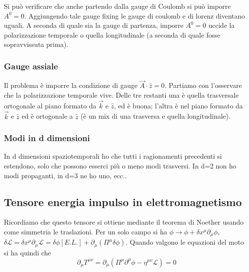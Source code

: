 \documentclass[12pt,oneside,notitlepage,abstracton,a4paper]{scrartcl}
\renewcommand{\L}{\mathcal{L}}
\begin{document}
Si può verificare che anche partendo dalla gauge di Coulomb si può imporre $A^0=0$. Aggiungendo tale gauge fixing le gauge di coulomb e di lorenz diventano uguali. A seconda di quale sia la gauge di partenza, imporre $A^0=0$ uccide la polarizzazione temporale o quella longitudinale (a seconda di quale fosse sopravvissuta prima).

\subsubsection{Gauge assiale}
Il problema è imporre la condizione di gauge $\vec{A} \cdot \hat{z} = 0$. Partiamo con l'osservare che la polarizzazione temporale vive. Delle tre restanti una è quella trasversale ortogonale al piano formato da $\vec{k}$ e $\hat{z}$, ed è buona; l'altra è nel piano formato da $\vec{k}$ e $\hat{z}$ ed è ortogonale a $\hat{z}$ (è un mix di una trasversa e quella longitudinale).

\subsubsection{Modi in d dimensioni}
In d dimensioni spaziotemporali ho che tutti i ragionamenti precedenti si estendono, solo che possono esserci più o meno modi trasversi. In d=2 non ho modi propaganti, in d=3 ne ho uno, ecc..

\subsection{Tensore energia impulso in elettromagnetismo}
Ricordiamo che questo tensore si ottiene mediante il teorema di Noether usando come simmetria le traslazioni. Per un solo campo si ha $\phi \rightarrow \phi + \delta x^\mu \partial_\mu \phi$, $\delta \L = \delta x^\mu \partial_\mu\L = \delta \phi [E.L.] + \partial_\mu (\Pi^\mu \delta \phi)$. Quando valgono le equazioni del moto si ha quindi che
\[ \partial_\mu T^{\mu\nu} = \partial_\mu(\Pi^\mu \partial^\mu \phi - \eta^{\mu\nu} \L) = 0 \]
\end{document}
